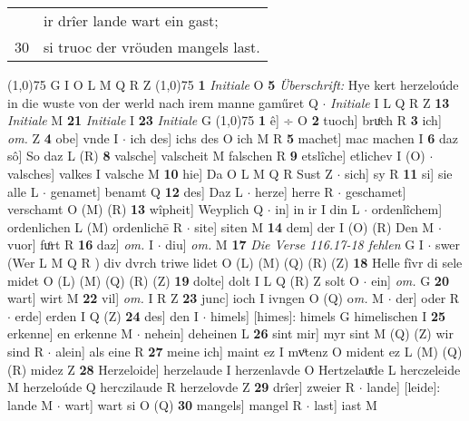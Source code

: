 \documentclass[8pt,a4paper,notitlepage]{article}
\begin{document}
\begin{table}[ht]
\begin{minipage}[t]{0.5\linewidth}
\begin{tabular}{rl}
 & ir drîer lande wart ein gast;\\ 
30 & si truoc der vröuden mangels last.\\ 
\end{tabular}
\scriptsize
\line(1,0){75} \newline
G I O L M Q R Z \newline
\line(1,0){75} \newline
\textbf{1} \textit{Initiale} O  \textbf{5} \textit{Überschrift:} Hye kert herzeloúde in die wuste von der werld nach irem manne gaműret Q   $\cdot$ \textit{Initiale} I L Q R Z  \textbf{13} \textit{Initiale} M  \textbf{21} \textit{Initiale} I  \textbf{23} \textit{Initiale} G  \newline
\line(1,0){75} \newline
\textbf{1} ê] ÷ O \textbf{2} tuoch] bruͦch R \textbf{3} ich] \textit{om.} Z \textbf{4} obe] vnde I  $\cdot$ ich des] ichs des O ich M R \textbf{5} machet] mac machen I \textbf{6} daz sô] So daz L (R) \textbf{8} valsche] valscheit M falschen R \textbf{9} etslîche] etlichev I (O)  $\cdot$ valsches] valkes I valsche M \textbf{10} hie] Da O L M Q R Sust Z  $\cdot$ sich] sy R \textbf{11} si] sie alle L  $\cdot$ genamet] benamt Q \textbf{12} des] Daz L  $\cdot$ herze] herre R  $\cdot$ geschamet] verschamt O (M) (R) \textbf{13} wîpheit] Weyplich Q  $\cdot$ in] in ir I din L  $\cdot$ ordenlîchem] ordenlichen L (M) ordenlichē R  $\cdot$ site] siten M \textbf{14} dem] der I (O) (R) Den M  $\cdot$ vuor] fuͦrt R \textbf{16} daz] \textit{om.} I  $\cdot$ diu] \textit{om.} M \textbf{17} \textit{Die Verse 116.17-18 fehlen} G I   $\cdot$ swer (Wer L M Q R ) div dvrch triwe lidet O (L) (M) (Q) (R) (Z) \textbf{18} Helle fîvr di sele midet O (L) (M) (Q) (R) (Z) \textbf{19} dolte] dolt I L Q (R) Z solt O  $\cdot$ ein] \textit{om.} G \textbf{20} wart] wirt M \textbf{22} vil] \textit{om.} I R Z \textbf{23} junc] ioch I ivngen O (Q) o\textit{m. } M  $\cdot$ der] oder R  $\cdot$ erde] erden I Q (Z) \textbf{24} des] den I  $\cdot$ himels] [himes]: himels G himelischen I \textbf{25} erkenne] en erkenne M  $\cdot$ nehein] deheinen L \textbf{26} sint mir] myr sint M (Q) (Z) wir sind R  $\cdot$ alein] als eine R \textbf{27} meine ich] maint ez I mvͦtenz O mident ez L (M) (Q) (R) midez Z \textbf{28} Herzeloide] herzelaude I herzenlavde O Hertzelauͯde L herczeleide M herzeloúde Q herczilaude R herzelovde Z \textbf{29} drîer] zweier R  $\cdot$ lande] [leide]: lande M  $\cdot$ wart] wart si O (Q) \textbf{30} mangels] mangel R  $\cdot$ last] iast M \newline

\end{minipage}
\end{table}
\end{document}
